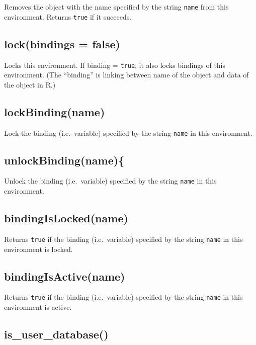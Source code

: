 \documentclass[]{book}
\begin{document}
Removes the object with the name specified by the string \texttt{name} from this environment. Returns \texttt{true} if it succeeds.

\hypertarget{lockbindings-false}{%
\subsection{lock(bindings = false)}\label{lockbindings-false}}

Locks this environment. If binding = \texttt{true}, it also locks bindings of this environment. (The ``binding'' is linking between name of the object and data of the object in R.)

\hypertarget{lockbindingname}{%
\subsection{lockBinding(name)}\label{lockbindingname}}

Lock the binding (i.e.~variable) specified by the string \texttt{name} in this environment.

\hypertarget{unlockbindingname}{%
\subsection{unlockBinding(name)\{}\label{unlockbindingname}}

Unlock the binding (i.e.~variable) specified by the string \texttt{name} in this environment.

\hypertarget{bindingislockedname}{%
\subsection{bindingIsLocked(name)}\label{bindingislockedname}}

Returns \texttt{true} if the binding (i.e.~variable) specified by the string \texttt{name} in this environment is locked.

\hypertarget{bindingisactivename}{%
\subsection{bindingIsActive(name)}\label{bindingisactivename}}

Returns \texttt{true} if the binding (i.e.~variable) specified by the string \texttt{name} in this environment is active.

\hypertarget{is_user_database}{%
\subsection{is\_user\_database()}\label{is_user_database}}
\end{document}
